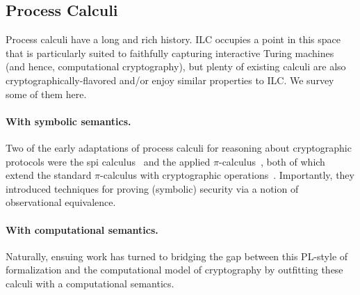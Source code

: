 \subsection{Process Calculi}
\label{subsec:process-calculi}

Process calculi have a long and rich history. ILC occupies a point in this space
that is particularly suited to faithfully capturing interactive Turing machines
(and hence, computational cryptography), but plenty of existing calculi are also
cryptographically-flavored and/or enjoy similar properties to ILC. We survey
some of them here.

\paragraph{With symbolic semantics.} Two of the early adaptations of process calculi for reasoning about
cryptographic protocols were the spi calculus~\cite{abadi1999calculus} and the
applied $\pi$-calculus~\cite{abadi2001mobile}, both of which extend the standard
$\pi$-calculus with cryptographic
operations~\cite{milner1999communicating}. Importantly, they introduced
techniques for proving (symbolic) security via a notion of observational
equivalence.

\paragraph{With computational semantics.}
Naturally, ensuing work has turned to bridging the gap between this PL-style of
formalization and the computational model of cryptography by outfitting these
calculi with a computational semantics.



